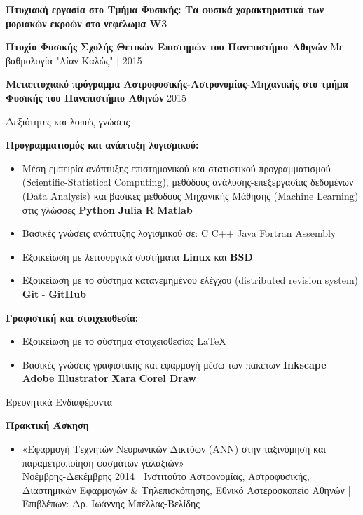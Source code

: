 \documentclass[a4paper,12pt,final]{memoir}
\newcommand{\SmallSep}{\vspace{0.25em}}
\newcommand{\CVSection}[1]
	{\Large{#1}\par
	\SmallSep\normalsize\normalfont}
\newcommand{\CVItem}[2]
	{\textbf{\color{RoyalBlue} #1} #2}
\newcommand{\location}[1]{ %
\small{\color{headings}#1}}
\newenvironment{tightitemize} %
{\vspace{-\topsep}\begin{itemize}\itemsep1pt \parskip0pt \parsep0pt}
{\end{itemize}\vspace{-\topsep}}
\begin{document}
\CVItem{Πτυχιακή εργασία στο Τμήμα Φυσικής: Τα φυσικά χαρακτηριστικά των μοριακών εκροών στο νεφέλωμα W3 \newline}
\SmallSep

\CVItem{Πτυχίο Φυσικής Σχολής Θετικών Επιστημών του Πανεπιστήμιο Αθηνών}{\newline}
\location{Με βαθμολογία "Λίαν Καλώς" | 2015}
\SmallSep

\CVItem{Μεταπτυχιακό πρόγραμμα Αστροφυσικής-Αστρονομίας-Μηχανικής στο τμήμα Φυσικής του Πανεπιστήμιο Αθηνών }{\newline}
\location{2015 -}
\SmallSep



\CVSection{Δεξιότητες και λοιπές γνώσεις}
\CVItem{Προγραμματισμός και ανάπτυξη λογισμικού:}{}
\begin{tightitemize}
\item Μέση εμπειρία ανάπτυξης επιστημονικού και στατιστικού προγραμματισμού (Scientific-Statistical Computing), μεθόδους ανάλυσης-επεξεργασίας δεδομένων (Data Analysis) και βασικές μεθόδους Μηχανικής Μάθησης (Machine Learning) στις γλώσσες \textbf{Python} \textbullet{} \textbf{Julia} \textbullet{} \textbf{R} \textbullet{} \textbf{Matlab}
\item Βασικές γνώσεις ανάπτυξης λογισμικού σε: C \textbullet{} C++ \textbullet{} Java \textbullet{} Fortran \textbullet{} Assembly 
\item Εξοικείωση με λειτουργικά συστήματα \textbf{Linux} και \textbf{BSD}
\item Εξοικείωση με το σύστημα κατανεμημένου ελέγχου (distributed revision system) \textbf{Git} - \textbf{GitHub}
\end{tightitemize}

\CVItem{Γραφιστική και στοιχειοθεσία:}{}
\begin{tightitemize}
\item Εξοικείωση με το σύστημα στοιχειοθεσίας \LaTeX\
\item Βασικές γνώσεις γραφιστικής και εφαρμογή μέσω των πακέτων \textbf{Inkscape} \textbullet{} \textbf{Adobe Illustrator} \textbullet{} \textbf{Xara} \textbullet{} \textbf{Corel Draw}
\end{tightitemize}
\SmallSep

\CVSection{Ερευνητικά Ενδιαφέροντα}
\CVItem{Πρακτική Άσκηση}{}
\begin{tightitemize}
	\item «Εφαρμογή Τεχνητών Νευρωνικών Δικτύων (ANN) στην ταξινόμηση και παραμετροποίηση φασμάτων γαλαξιών» \\
	\location{Νοέμβρης-Δεκέμβρης 2014 | Ινστιτούτο Αστρονομίας, Αστροφυσικής, Διαστημικών Εφαρμογών \& Τηλεπισκόπησης, Εθνικό Αστεροσκοπείο Αθηνών | Επιβλέπων: Δρ. Ιωάννης Μπέλλας-Βελίδης}
\end{tightitemize}
\end{document}
